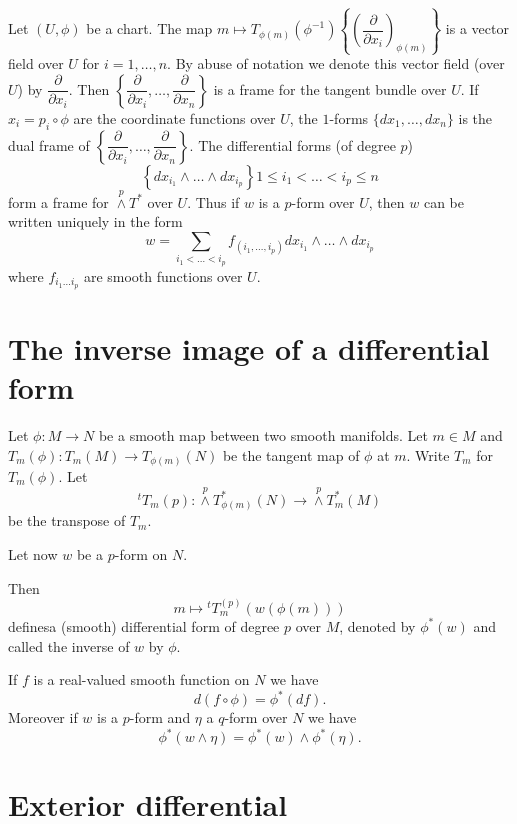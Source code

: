 Let $(U,\phi)$ be a chart. The map $m\mapsto T_{\phi(m)}(\phi^{-1})\left\{\left(\dfrac{\partial}{\partial x_{i}}\right)_{\phi(m)}\right\}$ is a vector field over $U$ for $i=1,\ldots,n$. By abuse of notation we denote this vector field (over $U$) by $\dfrac{\partial}{\partial x_{i}}$. Then $\left\{\dfrac{\partial}{\partial x_{i}},\ldots,\dfrac{\partial}{\partial x_{n}}\right\}$ is a frame for the tangent bundle over $U$. If $x_{i}=p_{i}\circ \phi$ are the coordinate functions over $U$, the $1$-forms $\{dx_{1},\ldots,dx_{n}\}$ is the dual frame of $\left\{\dfrac{\partial}{\partial x_{i}},\ldots,\dfrac{\partial}{\partial x_{n}}\right\}$. The differential forms (of degree $p$) 
$$
\left\{dx_{i_{1}}\wedge\ldots\wedge dx_{i_{p}}\right\}1\leq i_{1}<\ldots<i_{p}\leq n
$$
form a frame for ${\displaystyle{\mathop{\wedge}\limits^{p}}}T^{*}$ over $U$. Thus if $w$ is a $p$-form over $U$, then $w$ can be written uniquely in the form
$$
w=\sum\limits_{i_{1}<\ldots<i_{p}}f_{(i_{1},\ldots,i_{p})}dx_{i_{1}}\wedge\ldots\wedge dx_{i_{p}}
$$
where $f_{i_{1}\ldots i_{p}}$ are smooth functions over $U$.

\section*{The inverse image of a differential form}

Let $\phi:M\to N$ be a smooth map between two smooth manifolds. Let $m\in M$ and $T_{m}(\phi):T_{m}(M)\to T_{\phi(m)}(N)$ be the tangent map of $\phi$ at $m$. Write $T_{m}$ for $T_{m}(\phi)$. Let
$$
{}^{t}T_{m}(p): {\displaystyle{\mathop{\wedge}\limits^{p}}}T^{*}_{\phi(m)}(N)\to {\displaystyle{\mathop{\wedge}\limits^{p}}} T^{*}_{m}(M)
$$
be the transpose of $T_{m}$.

Let now $w$ be a $p$-form on $N$.

Then
$$
m\mapsto {}^{t}T^{(p)}_{m}(w(\phi(m)))
$$
defines\pageoriginale a (smooth) differential form of degree $p$ over $M$, denoted by $\phi^{*}(w)$ and called the inverse of $w$ by $\phi$.

If $f$ is a real-valued smooth function on $N$ we have 
$$
d(f\circ \phi)=\phi^{*}(df).
$$
Moreover if $w$ is a $p$-form and $\eta$ a $q$-form over $N$ we have 
$$
\phi^{*}(w\wedge \eta)=\phi^{*}(w)\wedge \phi^{*}(\eta).
$$

\section*{Exterior differential}

